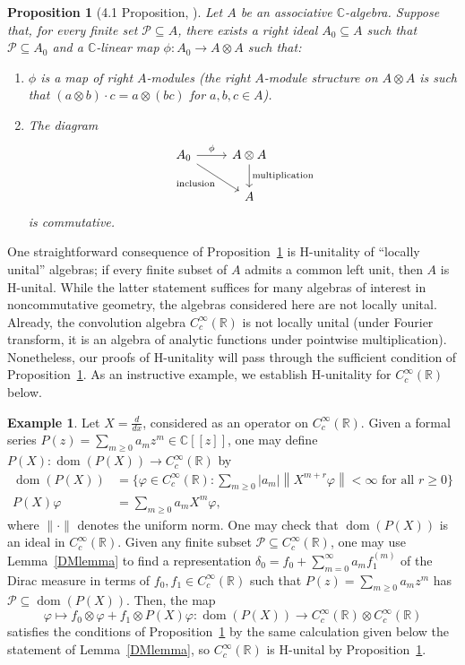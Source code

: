 \documentclass[12pt]{article}
\theoremstyle{plain}
\newtheorem{propn}[thm]{Proposition}
\theoremstyle{definition}
\newtheorem{ex}[thm]{Example}
\newcommand{\R}{\mathbb{R}}
\newcommand{\C}{\mathbb{C}}
\newcommand{\dom}{\operatorname{dom}}
\numberwithin{equation}{section}
\begin{document}
\begin{propn}[4.1 Proposition, \cite{Wodzicki}]\label{suffcond}
Let $A$ be an associative $\C$-algebra. Suppose that, for every finite set $\mathscr{P} \subseteq A$, there exists a right ideal $A_0 \subseteq A$ such that $\mathscr{P} \subseteq A_0$ and a $\C$-linear map  $\phi : A_0 \to A \otimes A$ such that:
\begin{enumerate}
\item $\phi$ is a map of right $A$-modules (the right $A$-module structure on $A\otimes A$ is such that $(a \otimes b)\cdot c = a\otimes(bc)$ for $a,b,c \in A$).
\item The diagram \[ \begin{tikzcd}
A_0 \ar[rd,"\text{inclusion}"'] \ar[r,"{\phi}"] & A \otimes A \ar[d,"\text{multiplication}"] \\
 & A
\end{tikzcd} \]
is commutative.
\end{enumerate}
\end{propn}


One straightforward consequence of Proposition~\ref{suffcond} is H-unitality of  ``locally unital'' algebras;  if   every finite subset of $A$ admits a common left unit, then $A$ is H-unital. While the latter statement suffices for many  algebras of interest   in noncommutative geometry, the algebras considered here are not locally unital.  Already, the convolution algebra $C_c^\infty(\R)$ is not locally unital (under Fourier transform, it is an algebra of analytic functions under pointwise multiplication). Nonetheless, our proofs of H-unitality will  pass through the sufficient condition of Proposition~\ref{suffcond}. As an instructive example, we establish H-unitality for $C_c^\infty(\R)$ below.

\begin{ex}
Let $X=\frac{d}{dx}$, considered as an operator on $C_c^\infty(\R)$. 
Given a formal series $P(z) = \sum_{m\geq 0 } a_m z^m \in \C[[z]]$, one may define $P(X) : \dom(P(X)) \to C_c^\infty(\R)$ by 
\begin{align*}
\dom(P(X)) &= \{ \varphi \in C_c^\infty(\R) : {\textstyle\sum_{m \geq 0}} |a_m| \left\| X^{m+r} \varphi   \right\| < \infty \text{ for all } r \geq 0 \} \\
P(X) \varphi &= \sum_{m \geq 0 } a_m X^m\varphi,
\end{align*}
where $\|\cdot\|$ denotes the uniform norm. One may check that $\dom(P(X))$ is an ideal in $C_c^\infty(\R)$.   Given any finite subset $\mathscr{P} \subseteq C_c^\infty(\R)$, one may use Lemma~\ref{DMlemma} to find a representation $\delta_0 = f_0 + \sum_{m=0}^\infty a_m f_1^{(m)}$ of the Dirac measure  in terms of $f_0,f_1 \in C_c^\infty(\R)$ such that $P(z) = \sum_{m \geq 0} a_m z^m$ has $\mathscr{P} \subseteq \dom(P(X))$. Then, the map  
\[ \varphi \mapsto  f_0 \otimes \varphi + f_1 \otimes P(X) \varphi : \dom(P(X)) \to C_c^\infty(\R) \otimes C_c^\infty(\R) \]
satisfies the conditions of Proposition~\ref{suffcond} by the same calculation given below  the statement of Lemma~\ref{DMlemma}, so  $C_c^\infty(\R)$ is H-unital by Proposition~\ref{suffcond}.
\end{ex}
\end{document}
